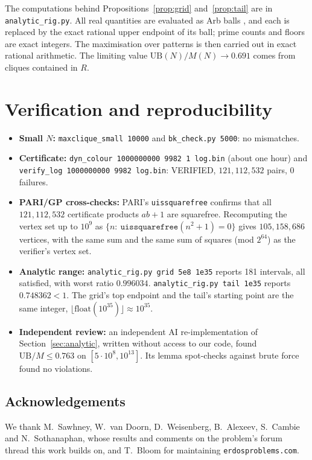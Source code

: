 \documentclass[11pt]{amsart}
\theoremstyle{definition}
\theoremstyle{remark}
\begin{document}
The computations behind Propositions~\ref{prop:grid} and~\ref{prop:tail} are in
\texttt{analytic\_rig.py}. All real quantities are evaluated as Arb balls \cite{Arb}, and each is replaced by
the exact rational upper endpoint of its ball; prime counts and floors are exact integers. The maximisation
over patterns is then carried out in exact rational arithmetic. The limiting value $\mathrm{UB}(N)/M(N)\to0.691$
comes from cliques contained in $R$.

\section{Verification and reproducibility}\label{sec:repro}
\begin{itemize}
\item \textbf{Small $N$:} \texttt{maxclique\_small 10000} and \texttt{bk\_check.py 5000}: no mismatches.
\item \textbf{Certificate:} \texttt{dyn\_colour 1000000000 9982 1 log.bin} (about one hour) and
  \texttt{verify\_log 1000000000 9982 log.bin}: VERIFIED, $121{,}112{,}532$ pairs, $0$ failures.
\item \textbf{PARI/GP cross-checks:} PARI's \texttt{uissquarefree} confirms that all
  $121{,}112{,}532$ certificate products $ab+1$ are squarefree. Recomputing the vertex set up to $10^9$ as
  $\{n:\ \texttt{uissquarefree}(n^2+1)=0\}$ gives $105{,}158{,}686$ vertices, with the same sum and the same
  sum of squares (mod $2^{64}$) as the verifier's vertex set.
\item \textbf{Analytic range:} \texttt{analytic\_rig.py grid 5e8 1e35} reports 181 intervals, all
  satisfied, with worst ratio $0.996034$. \texttt{analytic\_rig.py tail 1e35} reports $0.748362<1$. The grid's
  top endpoint and the tail's starting point are the same integer,
  $\lfloor\mathrm{float}(10^{35})\rfloor\approx10^{35}$.
\item \textbf{Independent review:} an independent AI re-implementation of Section~\ref{sec:analytic},
  written without access to our code, found $\mathrm{UB}/M\le0.763$ on $[5\cdot10^8,10^{13}]$. Its lemma
  spot-checks against brute force found no violations.
\end{itemize}

\subsection*{Acknowledgements} We thank M.~Sawhney, W.~van Doorn, D.~Weisenberg, B.~Alexeev, S.~Cambie and
N.~Sothanaphan, whose results and comments on the problem's forum thread this work builds on, and T.~Bloom
for maintaining \texttt{erdosproblems.com}.
\end{document}
